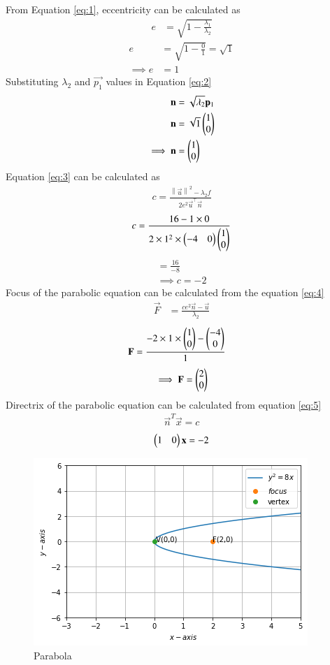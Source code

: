 \documentclass[journal,12pt,twocolumn]{IEEEtran}
\newcommand{\norm}[1]{\left\lVert#1\right\rVert}
\begin{document}
From Equation \ref{eq:1}, eccentricity can be calculated as
\begin{align}
    e&= \sqrt{1-\frac{\lambda_1}{\lambda_2}}
\end{align}
\begin{align}
    e&= \sqrt{1-\frac{0}{1}} =\sqrt{1}\\
     \implies e&= 1
\end{align}
Substituting $\lambda_2$ and $\vec{p_1}$ values in Equation {\ref{eq:2}}
\begin{align}
   \mathbf{n}&= \sqrt{\lambda_2}\mathbf{p}_1\\
   \mathbf{n}&= \sqrt{1}\begin{pmatrix}1\\0\end{pmatrix}\\
   \implies \mathbf{n}&=\begin{pmatrix}1\\0\end{pmatrix}
\end{align}
Equation \ref{eq:3} can be calculated as
\begin{align}
    c = \frac{\norm{\vec{u}}^2 - \lambda_2 f   }{2e^2\vec{u}^{\top}\vec{n}}
\end{align}
\begin{align}
    c = \frac{16-1\times0}{2 \times 1^2 \times \begin{pmatrix}-4&0\end{pmatrix}\begin{pmatrix}1\\0\end{pmatrix}}
\end{align}
\begin{align}
    =\frac{16}{-8}\\
    \implies c = -2
\end{align}
Focus of the parabolic equation can be calculated from the equation \ref{eq:4} 
 \begin{align}
  \vec{F}  &= \frac{ce^2\vec{n}-\vec{u}}{\lambda_2}
\end{align}
 \begin{align}
  \mathbf{F}  &= \frac{-2 \times 1 \times \begin{pmatrix}1\\0\end{pmatrix}-\begin{pmatrix}-4\\0\end{pmatrix}}{1}
\end{align}
\begin{align}
   \implies \mathbf{F}=\begin{pmatrix}2\\0\end{pmatrix} 
\end{align}
Directrix of the parabolic equation can be calculated from equation \ref{eq:5}
\begin{align}
   \vec{n}^T \vec{x}=c 
\end{align}
\begin{align}
    \begin{pmatrix}1&0\end{pmatrix}\mathbf{x}=-2
\end{align}
\begin{figure}[ht]
    \centering
    \includegraphics[width=\columnwidth]{parabola.png}
    \caption{Parabola}
    \label{Graphical solution}
\end{figure}
\end{document}
